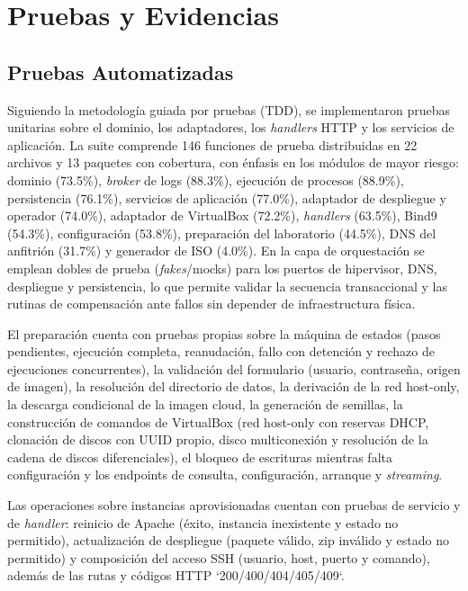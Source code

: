 \section{Pruebas y Evidencias}

\subsection{Pruebas Automatizadas}
Siguiendo la metodología guiada por pruebas (TDD), se implementaron pruebas unitarias sobre el dominio, los adaptadores, los \textit{handlers} HTTP y los servicios de aplicación. La suite comprende 146 funciones de prueba distribuidas en 22 archivos y 13 paquetes con cobertura, con énfasis en los módulos de mayor riesgo: dominio (73.5\%), \textit{broker} de logs (88.3\%), ejecución de procesos (88.9\%), persistencia (76.1\%), servicios de aplicación (77.0\%), adaptador de despliegue y operador (74.0\%), adaptador de VirtualBox (72.2\%), \textit{handlers} (63.5\%), Bind9 (54.3\%), configuración (53.8\%), preparación del laboratorio (44.5\%), DNS del anfitrión (31.7\%) y generador de ISO (4.0\%). En la capa de orquestación se emplean dobles de prueba (\textit{fakes}/mocks) para los puertos de hipervisor, DNS, despliegue y persistencia, lo que permite validar la secuencia transaccional y las rutinas de compensación ante fallos sin depender de infraestructura física.

El preparación cuenta con pruebas propias sobre la máquina de estados (pasos pendientes, ejecución completa, reanudación, fallo con detención y rechazo de ejecuciones concurrentes), la validación del formulario (usuario, contraseña, origen de imagen), la resolución del directorio de datos, la derivación de la red host-only, la descarga condicional de la imagen cloud, la generación de semillas, la construcción de comandos de VirtualBox (red host-only con reservas DHCP, clonación de discos con UUID propio, disco multiconexión y resolución de la cadena de discos diferenciales), el bloqueo de escrituras mientras falta configuración y los endpoints de consulta, configuración, arranque y \textit{streaming}.

Las operaciones sobre instancias aprovisionadas cuentan con pruebas de servicio y de \textit{handler}: reinicio de Apache (éxito, instancia inexistente y estado no permitido), actualización de despliegue (paquete válido, zip inválido y estado no permitido) y composición del acceso SSH (usuario, host, puerto y comando), además de las rutas y códigos HTTP `200/400/404/405/409`.

